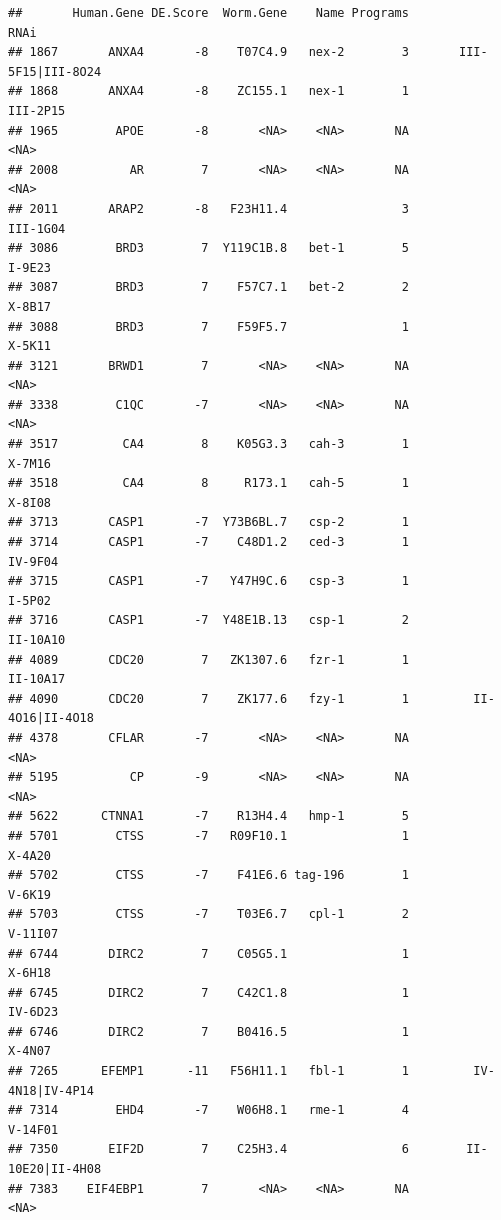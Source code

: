 \documentclass[
]{article}
\begin{document}
\begin{verbatim}
##       Human.Gene DE.Score  Worm.Gene    Name Programs                    RNAi
## 1867       ANXA4       -8    T07C4.9   nex-2        3       III-5F15|III-8O24
## 1868       ANXA4       -8    ZC155.1   nex-1        1                III-2P15
## 1965        APOE       -8       <NA>    <NA>       NA                    <NA>
## 2008          AR        7       <NA>    <NA>       NA                    <NA>
## 2011       ARAP2       -8   F23H11.4                3                III-1G04
## 3086        BRD3        7  Y119C1B.8   bet-1        5                  I-9E23
## 3087        BRD3        7    F57C7.1   bet-2        2                  X-8B17
## 3088        BRD3        7    F59F5.7                1                  X-5K11
## 3121       BRWD1        7       <NA>    <NA>       NA                    <NA>
## 3338        C1QC       -7       <NA>    <NA>       NA                    <NA>
## 3517         CA4        8    K05G3.3   cah-3        1                  X-7M16
## 3518         CA4        8     R173.1   cah-5        1                  X-8I08
## 3713       CASP1       -7  Y73B6BL.7   csp-2        1                        
## 3714       CASP1       -7    C48D1.2   ced-3        1                 IV-9F04
## 3715       CASP1       -7   Y47H9C.6   csp-3        1                  I-5P02
## 3716       CASP1       -7  Y48E1B.13   csp-1        2                II-10A10
## 4089       CDC20        7   ZK1307.6   fzr-1        1                II-10A17
## 4090       CDC20        7    ZK177.6   fzy-1        1         II-4O16|II-4O18
## 4378       CFLAR       -7       <NA>    <NA>       NA                    <NA>
## 5195          CP       -9       <NA>    <NA>       NA                    <NA>
## 5622      CTNNA1       -7    R13H4.4   hmp-1        5                        
## 5701        CTSS       -7   R09F10.1                1                  X-4A20
## 5702        CTSS       -7    F41E6.6 tag-196        1                  V-6K19
## 5703        CTSS       -7    T03E6.7   cpl-1        2                 V-11I07
## 6744       DIRC2        7    C05G5.1                1                  X-6H18
## 6745       DIRC2        7    C42C1.8                1                 IV-6D23
## 6746       DIRC2        7    B0416.5                1                  X-4N07
## 7265      EFEMP1      -11   F56H11.1   fbl-1        1         IV-4N18|IV-4P14
## 7314        EHD4       -7    W06H8.1   rme-1        4                 V-14F01
## 7350       EIF2D        7    C25H3.4                6        II-10E20|II-4H08
## 7383    EIF4EBP1        7       <NA>    <NA>       NA                    <NA>

\end{verbatim}
\end{document}
